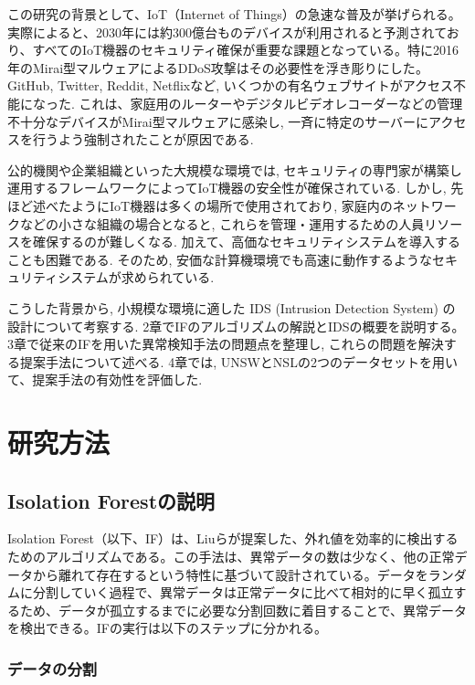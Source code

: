 \documentclass{css}
\begin{document}
この研究の背景として、IoT（Internet of Things）の急速な普及が挙げられる。実際によると、2030年には約300億台ものデバイスが利用されると予測されており、すべてのIoT機器のセキュリティ確保が重要な課題となっている。特に2016年のMirai型マルウェアによるDDoS攻撃はその必要性を浮き彫りにした\cite{8115504}。GitHub, Twitter, Reddit, Netflixなど, いくつかの有名ウェブサイトがアクセス不能になった. これは、家庭用のルーターやデジタルビデオレコーダーなどの管理不十分なデバイスがMirai型マルウェアに感染し, 一斉に特定のサーバーにアクセスを行うよう強制されたことが原因である.

公的機関や企業組織といった大規模な環境では, セキュリティの専門家が構築し運用するフレームワークによってIoT機器の安全性が確保されている. しかし, 先ほど述べたようにIoT機器は多くの場所で使用されており, 家庭内のネットワークなどの小さな組織の場合となると, これらを管理・運用するための人員リソースを確保するのが難しくなる. 加えて、高価なセキュリティシステムを導入することも困難である. そのため, 安価な計算機環境でも高速に動作するようなセキュリティシステムが求められている.

こうした背景から, 小規模な環境に適した IDS (Intrusion Detection System) の設計について考察する. 2章でIFのアルゴリズムの解説とIDSの概要を説明する。3章で従来のIFを用いた異常検知手法の問題点を整理し, これらの問題を解決する提案手法について述べる. 4章では, UNSWとNSLの2つのデータセットを用いて、提案手法の有効性を評価した.

\section{研究方法}

\subsection{Isolation Forestの説明}

Isolation Forest（以下、IF）は、Liuらが提案した\cite{Liu2008-bc}、外れ値を効率的に検出するためのアルゴリズムである。この手法は、異常データの数は少なく、他の正常データから離れて存在するという特性に基づいて設計されている。データをランダムに分割していく過程で、異常データは正常データに比べて相対的に早く孤立するため、データが孤立するまでに必要な分割回数に着目することで、異常データを検出できる。IFの実行は以下のステップに分かれる。

\subsubsection{データの分割}
\end{document}
